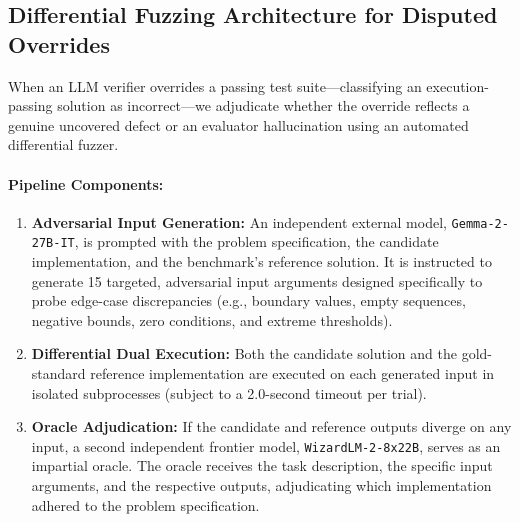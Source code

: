 \subsection{Differential Fuzzing Architecture for Disputed Overrides}
When an LLM verifier overrides a passing test suite—classifying an execution-passing solution as incorrect—we adjudicate whether the override reflects a genuine uncovered defect or an evaluator hallucination using an automated differential fuzzer.

\paragraph{Pipeline Components:}
\begin{enumerate}[nosep, leftmargin=*]
  \item \textbf{Adversarial Input Generation:} An independent external model, \texttt{Gemma-2-27B-IT}, is prompted with the problem specification, the candidate implementation, and the benchmark's reference solution. It is instructed to generate 15 targeted, adversarial input arguments designed specifically to probe edge-case discrepancies (e.g., boundary values, empty sequences, negative bounds, zero conditions, and extreme thresholds).
  \item \textbf{Differential Dual Execution:} Both the candidate solution and the gold-standard reference implementation are executed on each generated input in isolated subprocesses (subject to a 2.0-second timeout per trial).
  \item \textbf{Oracle Adjudication:} If the candidate and reference outputs diverge on any input, a second independent frontier model, \texttt{WizardLM-2-8x22B}, serves as an impartial oracle. The oracle receives the task description, the specific input arguments, and the respective outputs, adjudicating which implementation adhered to the problem specification.
\end{enumerate}

